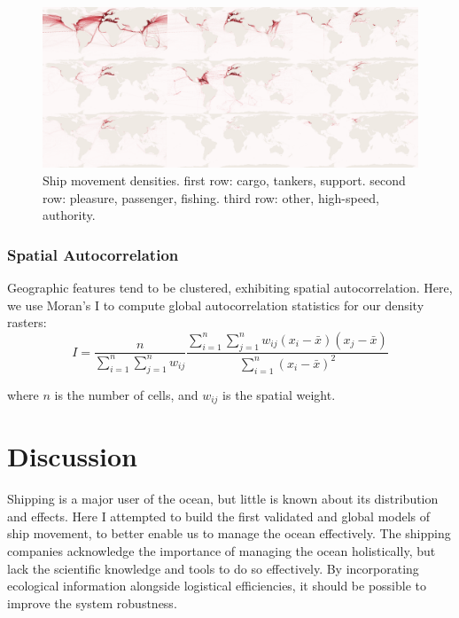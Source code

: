 \documentclass[12pt,letterpaper]{article}
\begin{document}
\begin{figure}[htbp]
  \centerline{\includegraphics[width=220mm]{figures/9fold-map-black-test_cropped_inverted_thesis.png}}
  \caption{Ship movement densities. first row: cargo, tankers, support. second row:  pleasure, passenger, fishing. third row: other, high-speed, authority.}
  \label{fig:9fold-ship-maps}
\end{figure}


\subsubsection{Spatial Autocorrelation}

Geographic features tend to be clustered, exhibiting spatial autocorrelation. Here, we use Moran's I to compute global autocorrelation statistics for our density rasters:
\begin{equation}
I = \frac{n}{\sum_{i=1}^{n}\sum_{j=1}^{n}w_{ij}}
\frac{\sum_{i=1}^{n}\sum_{j=1}^{n}w_{ij}(x_i-\bar{x})(x_j-\bar{x})}{\sum_{i=1}^{n}(x_i - \bar{x})^2}
\end{equation}

where $n$ is the number of cells, and $w_{ij}$ is the spatial weight.


\section{Discussion}


Shipping is a major user of the ocean, but little is known about its distribution and effects. Here I attempted to build the first validated and global models of ship movement, to better enable us to manage the ocean effectively. The shipping companies acknowledge the importance of managing the ocean holistically, but lack the scientific knowledge and tools to do so effectively. By incorporating ecological information alongside logistical efficiencies, it should be possible to improve the system robustness.
\end{document}
